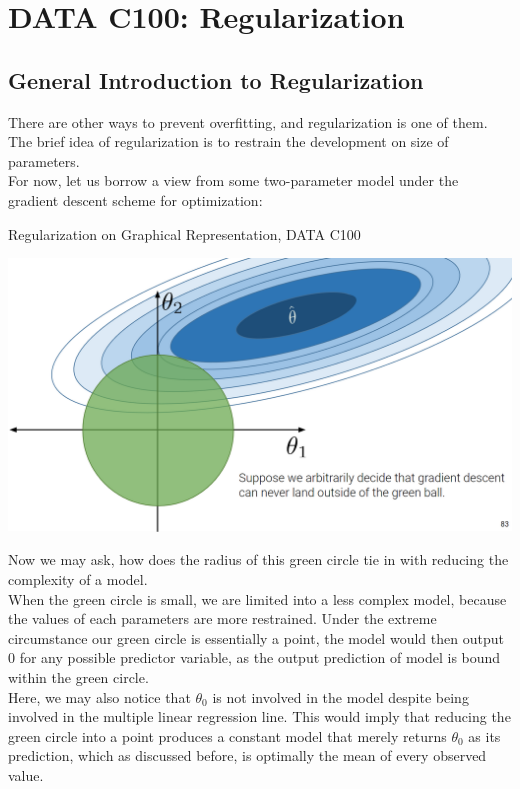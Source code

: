 \chapter{DATA C100: Regularization}

\section{General Introduction to Regularization}
There are other ways to prevent overfitting, and regularization is one of them. \\
The brief idea of regularization is to restrain the development on size of parameters. \\
For now, let us borrow a view from some two-parameter model under the gradient descent scheme for optimization:
\begin{ln-fig}{Regularization on Graphical Representation, DATA C100}{}
    \begin{center}
        \includegraphics[scale=0.2]{figs/ln07/lin-reg-regularize.png}
    \end{center}
\end{ln-fig}

Now we may ask, how does the radius of this green circle tie in with reducing the complexity of a model. \\
When the green circle is small, we are limited into a less complex model, because the values of each parameters are more restrained. Under the extreme circumstance our green circle is essentially a point, the model would then output $0$ for any possible predictor variable, as the output prediction of model is bound within the green circle. \\
Here, we may also notice that $\theta_0$ is not involved in the model despite being involved in the multiple linear regression line. This would imply that reducing the green circle into a point produces a constant model that merely returns $\theta_0$ as its prediction, which as discussed before, is optimally the mean of every observed value. \\

